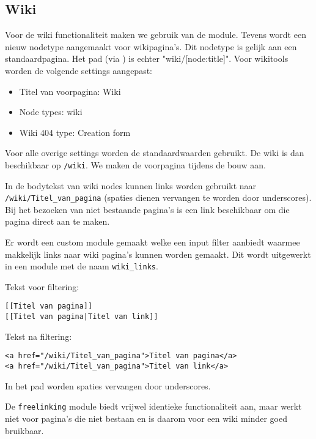 \subsection{Wiki}\label{wiki}

Voor de wiki functionaliteit maken we gebruik van de  module. Tevens wordt een nieuw nodetype aangemaakt voor wikipagina's. Dit nodetype is gelijk aan een standaardpagina. Het pad (via ) is echter "wiki/[node:title]". Voor wikitools worden de volgende settings aangepast:
\begin{itemize}
\item Titel van voorpagina: Wiki
\item Node types: wiki
\item Wiki 404 type: Creation form
\end{itemize}
Voor alle overige settings worden de standaardwaarden gebruikt. De wiki is dan beschikbaar op \texttt{/wiki}. We maken de voorpagina tijdens de bouw aan.

In de bodytekst van wiki nodes kunnen links worden gebruikt naar \texttt{/wiki/Titel\_van\_pagina} (spaties dienen vervangen te worden door underscores). Bij het bezoeken van niet bestaande pagina's is een link beschikbaar om die pagina direct aan te maken.

Er wordt een custom module gemaakt welke een input filter aanbiedt waarmee makkelijk links naar wiki pagina's kunnen worden gemaakt. Dit wordt uitgewerkt in een module met de naam \texttt{wiki\_links}.

Tekst voor filtering:
\begin{verbatim}
[[Titel van pagina]]
[[Titel van pagina|Titel van link]]
\end{verbatim}
Tekst na filtering:
\begin{verbatim}
<a href="/wiki/Titel_van_pagina">Titel van pagina</a>
<a href="/wiki/Titel_van_pagina">Titel van link</a>
\end{verbatim}
In het pad worden spaties vervangen door underscores.

De \texttt{freelinking} module biedt vrijwel identieke functionaliteit aan, maar werkt niet voor pagina's die niet bestaan en is daarom voor een wiki minder goed bruikbaar.

